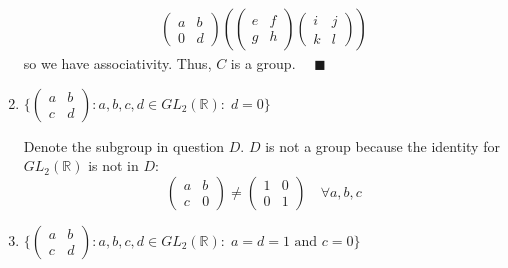 \documentclass[12pt]{article}
\newcommand{\R}{\mathbb{R}}
\newcommand{\qed}{\quad \blacksquare}
\begin{document}
\begin{enumerate}[label=(\alph*)]
\begin{align*}
\begin{pmatrix}
            a & b\\
            0 & d
        \end{pmatrix}\left(\begin{pmatrix}
            e & f\\
            g & h
        \end{pmatrix} \begin{pmatrix}
            i & j\\
            k & l
        \end{pmatrix} \right)
    \end{align*}
    so we have associativity. Thus, $C$ is a group. $\qed$
    \color{black}


    \item $\{\begin{pmatrix}
        a & b\\
        c & d
    \end{pmatrix}: a, b, c,d \in GL_2(\R): \; d = 0\}$

    \color{blue}
        Denote the subgroup in question $D$. $D$ is not a group because the identity for $GL_2(\R)$ is not in $D$:
        \[\begin{pmatrix}
            a & b\\
            c & 0
        \end{pmatrix} \neq \begin{pmatrix}
            1 & 0\\
            0 & 1
        \end{pmatrix} \quad \forall a, b, c\]
    \color{black}

    \item $\{\begin{pmatrix}
        a & b\\
        c & d
    \end{pmatrix}: a, b, c,d \in GL_2(\R): \; a = d = 1 \text{ and } c = 0\}$


\end{enumerate}
\end{document}
